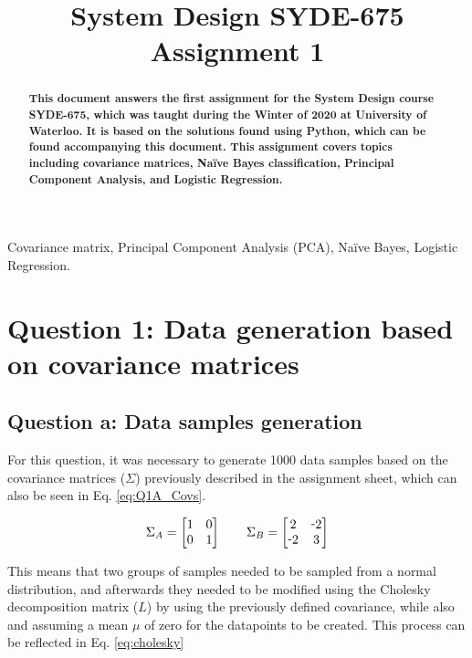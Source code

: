 \documentclass{article}
\title{System Design SYDE-675 Assignment 1}
\def\-{\raisebox{.75pt}{-}}
\begin{document}
%
\maketitle

\begin{abstract}
\ninept
\textbf{
This document answers the first assignment for the System Design course SYDE-675, which was taught during the Winter of 2020 at University of Waterloo. It is based on the solutions found using Python, which can be found accompanying this document.
This assignment covers topics including covariance matrices, Naïve Bayes classification, Principal Component Analysis, and Logistic Regression.
} 
\end{abstract}
%
\begin{keywords}
\ninept
Covariance matrix, Principal Component Analysis (PCA), Naïve Bayes, Logistic Regression.
\end{keywords} 
%

\section{Question 1: Data generation based on covariance matrices}
\subsection{Question a: Data samples generation}
\label{subsec:Q1A}
For this question, it was necessary to generate 1000 data samples based on the covariance matrices ($\Sigma$) previously described in the assignment sheet, which can also be seen in Eq. \ref{eq:Q1A_Covs}.

\begin{gather}\label{eq:Q1A_Covs}
\Sigma_A = \begin{bmatrix}
1 & 0\\
0 & 1
\end{bmatrix}
\qquad
\Sigma_B = \begin{bmatrix}
2 & \-2\\
\-2 & 3
\end{bmatrix}
\end{gather}

This means that two groups of samples needed to be sampled from a normal distribution, and afterwards they needed to be modified using the Cholesky decomposition matrix ($L$) by using the previously defined covariance, while also and assuming a mean $\mu$ of zero for the datapoints to be created. This process can be reflected in Eq. \ref{eq:cholesky}
\end{document}
